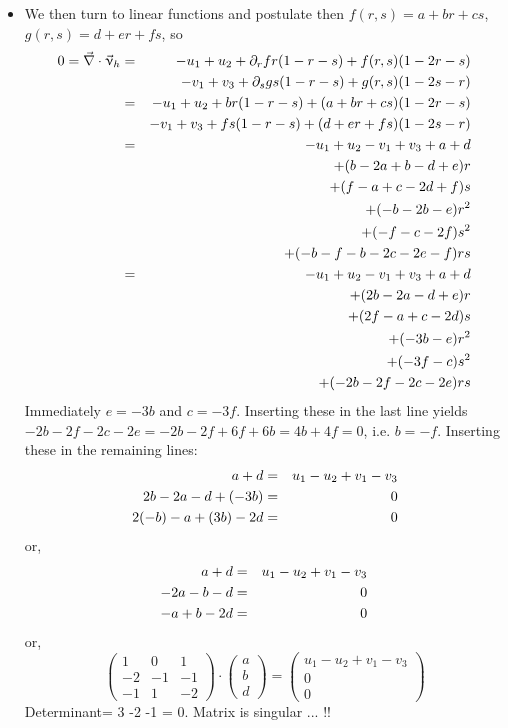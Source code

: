 \begin{itemize}
\item
We then turn to linear functions and postulate then $f(r,s)=a+br+cs$, $g(r,s)=d+er+fs$, so  
\begin{eqnarray}
0=\vec\nabla\cdot\vec\upnu_h 
&=& -u_1+u_2 + \partial_r f r(1-r-s) + f(r,s)(1-2r-s) \nonumber\\
&&  -v_1+v_3 + \partial_s g s(1-r-s) + g(r,s)(1-2s-r) \nonumber\\
&=& -u_1+u_2 + b r(1-r-s) + (a+br+cs) (1-2r-s) \nonumber\\
&&  -v_1+v_3 + f s(1-r-s) + (d+er+fs)(1-2s-r) \nonumber\\
&=& -u_1+u_2  -v_1+v_3 + a + d \nonumber\\
&& +(b-2a+b-d+e)r \nonumber\\
&& +(f-a+c-2d+f)s \nonumber\\
&& +(-b-2b-e)r^2 \nonumber\\
&& +(-f-c-2f)s^2 \nonumber\\
&& +(-b-f-b-2c-2e-f)rs \nonumber\\
&=& -u_1+u_2  -v_1+v_3 + a + d \nonumber\\
&& +(2b-2a-d+e)r \nonumber\\
&& +(2f-a+c-2d)s \nonumber\\
&& +(-3b-e)r^2 \nonumber\\
&& +(-3f-c)s^2 \nonumber\\
&& +(-2b-2f-2c-2e)rs  \nonumber
\end{eqnarray}
Immediately $e=-3b$ and $c=-3f$. Inserting these in the last line yields
$-2b-2f-2c-2e=-2b-2f+6f+6b=4b+4f=0$, i.e. $b=-f$.
Inserting these in the remaining lines:
\begin{eqnarray}
a+d &=& u_1-u_2  +v_1-v_3 \nonumber\\
2b-2a-d+(-3b) &=& 0 \nonumber\\
2(-b)-a+(3b)-2d &=& 0 \nonumber
\end{eqnarray}
or,
\begin{eqnarray}
a+d &=& u_1-u_2  +v_1-v_3 \nonumber\\
-2a-b-d &=& 0 \nonumber\\
-a + b-2d &=& 0 \nonumber
\end{eqnarray}
or, 
\[
\left(
\begin{array}{ccc}
1 &0 & 1 \\
-2 & -1 & -1 \\
-1 & 1 & -2 
\end{array}
\right)
\cdot
\left(
\begin{array}{c}
a \\ b  \\d 
\end{array}
\right)
=
\left(
\begin{array}{c}
u_1-u_2+v_1-v_3 \\
0 \\ 0 
\end{array}
\right)
\]
Determinant= 3 -2 -1 = 0. Matrix is singular ... !! 


\end{itemize}
